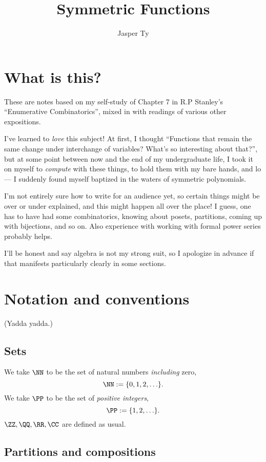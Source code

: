 \documentclass{article}
\title{Symmetric Functions}
\author{Jasper Ty}
\date{}
\begin{document}
\maketitle

\section*{What is this?}
These are notes based on my self-study of Chapter 7 in R.P Stanley's ``Enumerative Combinatorics'', mixed in with readings of various other expositions. 

I've learned to \textit{love} this subject! At first, I thought ``Functions that remain the same change under interchange of variables? What's so interesting about that?'', but at some point between now and the end of my undergraduate life, I took it on myself to \textit{compute} with these things, to hold them with my bare hands, and lo--- I suddenly found myself baptized in the waters of symmetric polynomials.

I'm not entirely sure how to write for an audience yet, so certain things might be over or under explained, and this might happen all over the place!
I guess, one has to have had some combinatorics, knowing about posets, partitions, coming up with bijections, and so on. 
Also experience with working with formal power series probably helps.

I'll be honest and say algebra is not my strong suit, so I apologize in advance if that manifests particularly clearly in some sections.

\tableofcontents

\section*{Notation and conventions}

(Yadda yadda.)


\subsection*{Sets}

We take $\NN$ to be the set of natural numbers \textit{including} zero,
\[
    \NN := \{0,1,2,\ldots\}.
\]
We take $\PP$ to be the set of \textit{positive integers},
\[
    \PP := \{1,2,\ldots\}.
\]
$\ZZ,\QQ,\RR,\CC$ are defined as usual.

\subsection*{Partitions and compositions}
\end{document}
